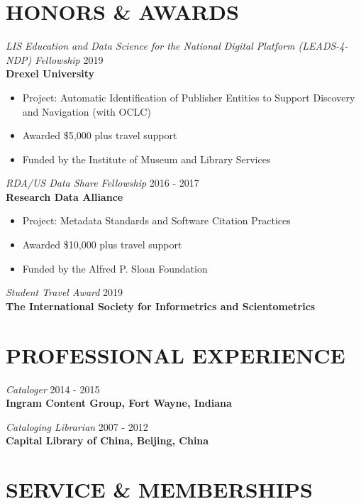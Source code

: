 \documentclass[margin, 10pt]{res} %
\begin{document}
\begin{resume}
\section{HONORS \& AWARDS}

{\sl LIS Education and Data Science for the National Digital Platform (LEADS-4-NDP) Fellowship}  \hfill 2019 \\
\textbf{Drexel University}
\begin{itemize}
\item Project: Automatic Identification of Publisher Entities to Support Discovery and Navigation (with OCLC)
\item Awarded \$5,000 plus travel support
\item Funded by the Institute of Museum and Library Services
\end{itemize} 

{\sl RDA/US Data Share Fellowship}  \hfill 2016 - 2017 \\
\textbf{Research Data Alliance}
\begin{itemize}
\item Project: Metadata Standards and Software Citation Practices
\item Awarded \$10,000 plus travel support
\item Funded by the Alfred P. Sloan Foundation
\end{itemize} 

{\sl Student Travel Award} \hfill 2019 \\
\textbf{The International Society for Informetrics and Scientometrics}

\section{PROFESSIONAL EXPERIENCE}

\textit{Cataloger} \hfill 2014 - 2015\\
\textbf{Ingram Content Group, Fort Wayne, Indiana}

\textit{Cataloging Librarian} \hfill 2007 - 2012\\
\textbf{Capital Library of China, Beijing, China}

\section{SERVICE \& MEMBERSHIPS}


\end{resume}
\end{document}
